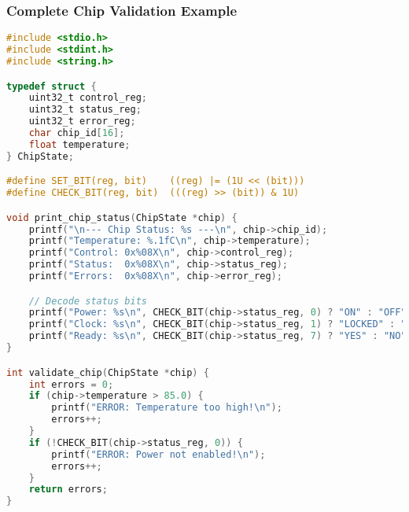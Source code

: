 \documentclass{beamer}
\begin{document}
\begin{frame}[fragile]
\frametitle{Complete Chip Validation Example}
\begin{lstlisting}[language=C, basicstyle=\fontsize{4}{3}\selectfont\ttfamily]
#include <stdio.h>
#include <stdint.h>
#include <string.h>

typedef struct {
    uint32_t control_reg;
    uint32_t status_reg;
    uint32_t error_reg;
    char chip_id[16];
    float temperature;
} ChipState;

#define SET_BIT(reg, bit)    ((reg) |= (1U << (bit)))
#define CHECK_BIT(reg, bit)  (((reg) >> (bit)) & 1U)

void print_chip_status(ChipState *chip) {
    printf("\n--- Chip Status: %s ---\n", chip->chip_id);
    printf("Temperature: %.1fC\n", chip->temperature);
    printf("Control: 0x%08X\n", chip->control_reg);
    printf("Status:  0x%08X\n", chip->status_reg);
    printf("Errors:  0x%08X\n", chip->error_reg);

    // Decode status bits
    printf("Power: %s\n", CHECK_BIT(chip->status_reg, 0) ? "ON" : "OFF");
    printf("Clock: %s\n", CHECK_BIT(chip->status_reg, 1) ? "LOCKED" : "FREE");
    printf("Ready: %s\n", CHECK_BIT(chip->status_reg, 7) ? "YES" : "NO");
}

int validate_chip(ChipState *chip) {
    int errors = 0;
    if (chip->temperature > 85.0) {
        printf("ERROR: Temperature too high!\n");
        errors++;
    }
    if (!CHECK_BIT(chip->status_reg, 0)) {
        printf("ERROR: Power not enabled!\n");
        errors++;
    }
    return errors;
}
\end{lstlisting}
\end{frame}
\end{document}
